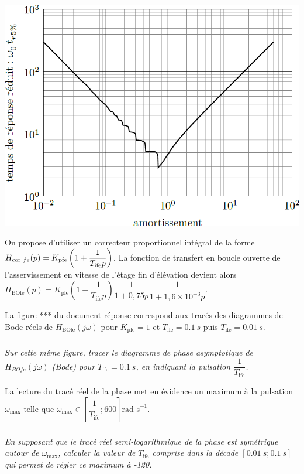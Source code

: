 \documentclass[10pt,fleqn]{article} %
\begin{document}
\begin{multicols}{2}
\begin{center}
\includegraphics[width=\linewidth]{images/fig_03}
\end{center}


On propose d’utiliser un correcteur proportionnel intégral de la forme $H_{\text{cor }fe}(p)=K_{\text{\text{pfe}}}\left(1+\dfrac{1}{T_{\text{ife}}p}\right)$. La fonction de transfert en boucle ouverte de l’asservissement en vitesse de l’étage fin d’élévation devient alors 
$
H_{\text{BOfe}}(p)=K_{\text{pfe}}\left( 1+\dfrac{1}{T_{\text{ife}}p}\right) \dfrac{1}{1+0,75p} \dfrac{1}{1+1,6\times 10^{-3}p}
$.

La figure *** du document réponse correspond aux tracés des diagrammes de Bode réels de $H_{\text{BOfe}}(j\omega)$ 
pour $K_{\text{pfe}}=1$ et $T_{\text{ife}}=\SI{0,1}{s}$ puis $T_{\text{ife}}=\SI{0,01}{s}$.


\subparagraph{}\textit{Sur cette même figure, tracer le diagramme de phase asymptotique de $H_{BOfe}(j\omega)$
(Bode) pour $T_{\text{ife}}=\SI{0,1}{s}$, en indiquant la pulsation $\dfrac{1}{T_{\text{ife}}}$.}
\ifprof
\begin{corrige}
\end{corrige}
\else
\fi

La lecture du tracé réel de la phase met en évidence un maximum à la pulsation $\omega_{\text{max}}$ telle que $\omega_{\text{max}}\in \left[\dfrac{1}{T_{\text{ife}}};600 \right]\text{rad s}^{-1}$.

\subparagraph{}\textit{En supposant que le tracé réel semi-logarithmique de la phase est symétrique autour de $\omega_{\text{max}}$, calculer la valeur de $T_{\text{ife}}$ comprise dans la décade $\left[\SI{0,01}{s}; \SI{0,1}{s}\right]$ qui permet de régler ce maximum à -120\degres.}
\ifprof
\begin{corrige}
\end{corrige}
\else
\fi


\end{multicols}
\end{document}
